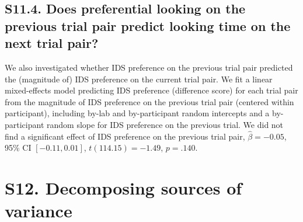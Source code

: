 \documentclass[
  english,
  man, donotrepeattitle,floatsintext]{apa6}
\begin{document}
\hypertarget{s11.4.-does-preferential-looking-on-the-previous-trial-pair-predict-looking-time-on-the-next-trial-pair}{%
\subsection{S11.4. Does preferential looking on the previous trial pair predict looking time on the next trial pair?}\label{s11.4.-does-preferential-looking-on-the-previous-trial-pair-predict-looking-time-on-the-next-trial-pair}}

We also investigated whether IDS preference on the previous trial pair predicted the (magnitude of) IDS preference on the current trial pair.
We fit a linear mixed-effects model predicting IDS preference (difference score) for each trial pair from the magnitude of IDS preference on the previous trial pair (centered within participant), including by-lab and by-participant random intercepts and a by-participant random slope for IDS preference on the previous trial.
We did not find a significant effect of IDS preference on the previous trial pair, \(\hat{\beta} = -0.05\), 95\% CI \([-0.11, 0.01]\), \(t(114.15) = -1.49\), \(p = .140\).

\hypertarget{s12.-decomposing-sources-of-variance}{%
\section{S12. Decomposing sources of variance}\label{s12.-decomposing-sources-of-variance}}
\end{document}
